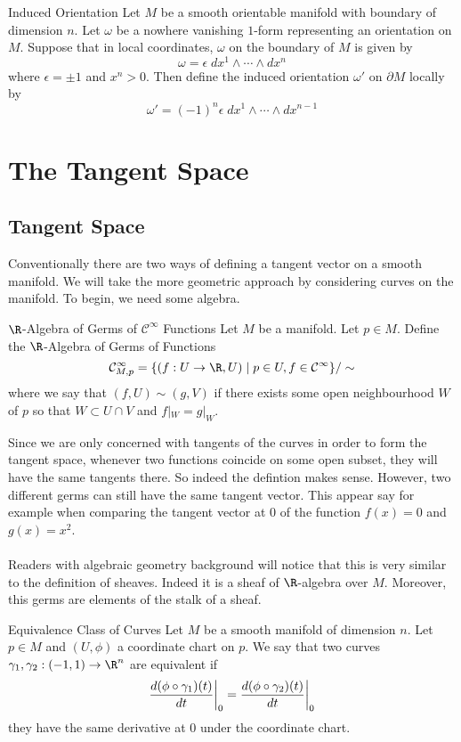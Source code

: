 \documentclass[a4paper]{article}
\begin{document}
\begin{defn}{Induced Orientation}{} Let $M$ be a smooth orientable manifold with boundary of dimension $n$. Let $\omega$ be a nowhere vanishing $1$-form representing an orientation on $M$. Suppose that in local coordinates, $\omega$ on the boundary of $M$ is given by $$\omega=\epsilon\;dx^1\wedge\cdots\wedge dx^n$$ where $\epsilon=\pm1$ and $x^n>0$. Then define the induced orientation $\omega'$ on $\partial M$ locally by $$\omega'=(-1)^n\epsilon\;dx^1\wedge\cdots\wedge dx^{n-1}$$
\end{defn}

\pagebreak
\section{The Tangent Space}
\subsection{Tangent Space}
Conventionally there are two ways of defining a tangent vector on a smooth manifold. We will take the more geometric approach by considering curves on the manifold. To begin, we need some algebra. 

\begin{defn}{$\R$-Algebra of Germs of $\mathcal{C}^\infty$ Functions}{} Let $M$ be a manifold. Let $p\in M$. Define the $\R$-Algebra of Germs of Functions $$\mathcal{C}_{M,p}^\infty=\{(f:U\to\R, U)\;|\;p\in U, f\in\mathcal{C}^\infty\}/\sim$$ where we say that $(f,U)\sim(g,V)$ if there exists some open neighbourhood $W$ of $p$ so that $W\subset U\cap V$ and $f|_W=g|_W$. 
\end{defn}

Since we are only concerned with tangents of the curves in order to form the tangent space, whenever two functions coincide on some open subset, they will have the same tangents there. So indeed the defintion makes sense. However, two different germs can still have the same tangent vector. This appear say for example when comparing the tangent vector at $0$ of the function $f(x)=0$ and $g(x)=x^2$. \\~\\

Readers with algebraic geometry background will notice that this is very similar to the definition of sheaves. Indeed it is a sheaf of $\R$-algebra over $M$. Moreover, this germs are elements of the stalk of a sheaf. 

\begin{defn}{Equivalence Class of Curves}{} Let $M$ be a smooth manifold of dimension $n$. Let $p\in M$ and $(U,\phi)$ a coordinate chart on $p$. We say that two curves $\gamma_1,\gamma_2:(-1,1)\to\R^n$ are equivalent if $$\frac{d(\phi\circ\gamma_1)(t)}{dt}\bigg{|}_0=\frac{d(\phi\circ\gamma_2)(t)}{dt}\bigg{|}_0$$ they have the same derivative at $0$ under the coordinate chart. 
\end{defn}
\end{document}
